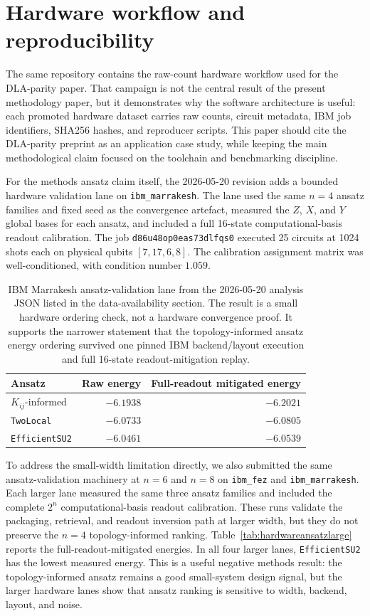 \documentclass[preprint,aps,physrev,superscriptaddress,floatfix,longbibliography]{revtex4-2}
\begin{document}
\section{Hardware workflow and reproducibility}

The same repository contains the raw-count hardware workflow used for the
DLA-parity paper. That campaign is not the central result of the present
methodology paper, but it demonstrates why the software architecture is
useful: each promoted hardware dataset carries raw counts, circuit
metadata, IBM job identifiers, SHA256 hashes, and reproducer scripts. This
paper should cite the DLA-parity preprint as an application case study,
while keeping the main methodological claim focused on the toolchain and
benchmarking discipline.

For the methods ansatz claim itself, the 2026-05-20 revision adds a
bounded hardware validation lane on \texttt{ibm\_marrakesh}. The lane used
the same $n=4$ ansatz families and fixed seed as the convergence artefact,
measured the $Z$, $X$, and $Y$ global bases for each ansatz, and included a
full 16-state computational-basis readout calibration. The job
\texttt{d86u48op0eas73dlfqs0} executed 25 circuits at 1024 shots each on
physical qubits $[7,17,6,8]$. The calibration assignment matrix was
well-conditioned, with condition number $1.059$.

\begin{table}[tb]
\centering
\small
\begin{tabular}{lrr}
\toprule
Ansatz & Raw energy & Full-readout mitigated energy \\
\midrule
$K_{ij}$-informed & $-6.1938$ & $-6.2021$ \\
\texttt{TwoLocal} & $-6.0733$ & $-6.0805$ \\
\texttt{EfficientSU2} & $-6.0461$ & $-6.0539$ \\
\bottomrule
\end{tabular}
\caption{IBM Marrakesh ansatz-validation lane from the 2026-05-20 analysis
JSON listed in the data-availability section. The result is a small hardware
ordering check, not a hardware convergence proof. It supports the narrower
statement that the topology-informed ansatz energy ordering survived one
pinned IBM backend/layout execution and full 16-state readout-mitigation
replay.}
\label{tab:hardwareansatz}
\end{table}

To address the small-width limitation directly, we also submitted the same
ansatz-validation machinery at $n=6$ and $n=8$ on \texttt{ibm\_fez} and
\texttt{ibm\_marrakesh}. Each larger lane measured the same three ansatz
families and included the complete $2^n$ computational-basis readout
calibration. These runs validate the packaging, retrieval, and readout
inversion path at larger width, but they do not preserve the $n=4$
topology-informed ranking. Table~\ref{tab:hardwareansatzlarge} reports the
full-readout-mitigated energies. In all four larger lanes,
\texttt{EfficientSU2} has the lowest measured energy. This is a useful negative
methods result: the topology-informed ansatz remains a good small-system design
signal, but the larger hardware lanes show that ansatz ranking is sensitive to
width, backend, layout, and noise.
\end{document}
